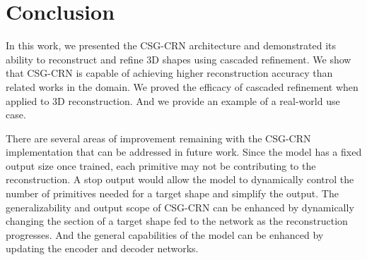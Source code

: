 
\chapter{Conclusion}
\label{chap:conclusion}

In this work, we presented the CSG-CRN architecture and demonstrated its ability to reconstruct and refine 3D shapes using cascaded refinement. We show that CSG-CRN is capable of achieving higher reconstruction accuracy than related works in the domain. We proved the efficacy of cascaded refinement when applied to 3D reconstruction. And we provide an example of a real-world use case.

There are several areas of improvement remaining with the CSG-CRN implementation that can be addressed in future work. Since the model has a fixed output size once trained, each primitive may not be contributing to the reconstruction. A stop output would allow the model to dynamically control the number of primitives needed for a target shape and simplify the output. The generalizability and output scope of CSG-CRN can be enhanced by dynamically changing the section of a target shape fed to the network as the reconstruction progresses. And the general capabilities of the model can be enhanced by updating the encoder and decoder networks.
